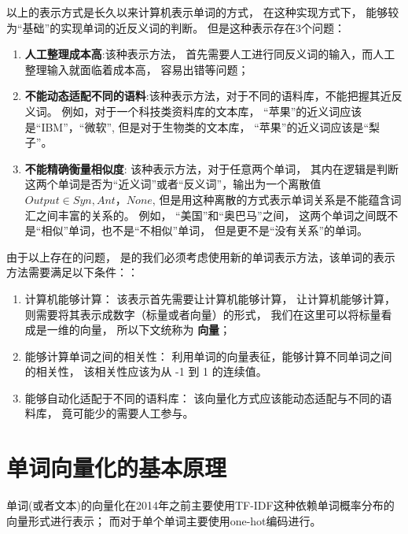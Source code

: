 以上的表示方式是长久以来计算机表示单词的方式， 在这种实现方式下， 能够较为“基础”的实现单词的近反义词的判断。 但是这种表示存在3个问题： 

\begin{enumerate}
\item{\textbf{人工整理成本高}}:该种表示方法， 首先需要人工进行同反义词的输入，而人工整理输入就面临着成本高， 容易出错等问题；
\item{\textbf{不能动态适配不同的语料}}:该种表示方法，对于不同的语料库，不能把握其近反义词。 例如，对于一个科技类资料库的文本库， “苹果”的近义词应该是“IBM”，“微软”, 但是对于生物类的文本库， “苹果”的近义词应该是“梨子”。 

\item{\textbf{不能精确衡量相似度}}: 该种表示方法，对于任意两个单词， 其内在逻辑是判断这两个单词是否为“近义词”或者“反义词”，输出为一个离散值 $Output \in {Syn, Ant，None}$, 但是用这种离散的方式表示单词关系是不能蕴含词汇之间丰富的关系的。 例如， “美国”和“奥巴马”之间， 这两个单词之间既不是“相似”单词，也不是“不相似”单词， 但是更不是“没有关系”的单词。 

\end{enumerate}

由于以上存在的问题， 是的我们必须考虑使用新的单词表示方法，该单词的表示方法需要满足以下条件：：

\begin{enumerate}

\item{计算机能够计算}： 该表示首先需要让计算机能够计算， 让计算机能够计算， 则需要将其表示成数字（标量或者向量）的形式， 我们在这里可以将标量看成是一维的向量， 所以下文统称为 \textbf{向量}；

\item{能够计算单词之间的相关性}： 利用单词的向量表征，能够计算不同单词之间的相关性， 该相关性应该为从 -1 到 1 的连续值。 

\item{能够自动化适配于不同的语料库}： 该向量化方式应该能动态适配与不同的语料库， 竟可能少的需要人工参与。 

\end{enumerate}

\section{单词向量化的基本原理}


单词(或者文本)的向量化在2014年之前主要使用TF-IDF这种依赖单词概率分布的向量形式进行表示； 而对于单个单词主要使用one-hot编码进行。


